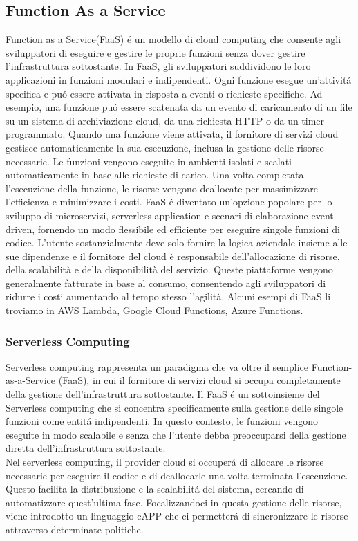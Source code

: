 \documentclass[../../main.tex]{subfiles}
\begin{document}
\subsection{Function As a  Service}
Function as a Service(FaaS) é un modello di cloud computing che consente agli sviluppatori di eseguire e gestire le proprie funzioni senza dover gestire l'infrastruttura sottostante.
In FaaS, gli sviluppatori suddividono le loro applicazioni in funzioni modulari e indipendenti. Ogni funzione esegue un'attivitá specifica e puó essere attivata in risposta a eventi o richieste specifiche. Ad esempio, una funzione puó essere scatenata da un evento di caricamento di un file su un sistema di archiviazione cloud, da una richiesta HTTP o da un timer programmato. Quando una funzione viene attivata, il fornitore di servizi cloud gestisce automaticamente la sua esecuzione, inclusa la gestione delle risorse necessarie. Le funzioni vengono eseguite in ambienti isolati e scalati automaticamente in base alle richieste di carico. Una volta completata l'esecuzione della funzione, le risorse vengono deallocate per massimizzare l'efficienza e minimizzare i costi.
FaaS é diventato un'opzione popolare per lo sviluppo di microservizi, serverless application e scenari di elaborazione event-driven, fornendo un modo flessibile ed efficiente per eseguire singole funzioni di codice.
L'utente sostanzialmente deve solo fornire la logica aziendale insieme alle sue dipendenze e il fornitore del cloud è responsabile dell'allocazione di risorse, della scalabilità e della disponibilità del servizio. Queste piattaforme vengono generalmente fatturate in base al consumo, consentendo agli sviluppatori di ridurre i costi aumentando al tempo stesso l'agilità.\cite{bhatt2022study}
Alcuni esempi di FaaS li troviamo in AWS Lambda, Google Cloud Functions, Azure Functions.

\subsubsection{Serverless Computing}
Serverless computing rappresenta un paradigma che va oltre il semplice Function-as-a-Service (FaaS), in cui il fornitore di servizi cloud si occupa completamente della gestione dell'infrastruttura sottostante. Il FaaS é un sottoinsieme del Serverless computing che si concentra specificamente sulla gestione delle singole funzioni come entitá indipendenti. In questo contesto, le funzioni vengono eseguite in modo scalabile e senza che l'utente debba preoccuparsi della gestione diretta dell'infrastruttura sottostante.\autocite{amslaurea24930}\\
Nel serverless computing, il provider cloud si occuperá di allocare le risorse necessarie per eseguire il codice e di deallocarle una volta terminata l'esecuzione. Questo facilita la distribuzione e la scalabilitá del sistema, cercando di automatizzare quest'ultima fase.
Focalizzandoci in questa gestione delle risorse, viene introdotto un linguaggio cAPP che ci permetterá di sincronizzare le risorse attraverso determinate politiche.
\newpage
\end{document}
